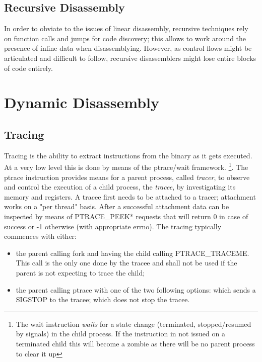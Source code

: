 \subsection{Recursive Disassembly}
In order to obviate to the issues of linear disassembly, recursive techniques rely on function calls and jumps for code discovery; this allows to work around the presence of inline data when disassemblying. However, as control flows might be articulated and difficult to follow, recursive disassemblers might lose entire blocks of code entirely.


\section{Dynamic Disassembly}

\subsection{Tracing}
Tracing is the ability to extract instructions from the binary as it gets executed. At a very low level this is done by means of the {\ttfamily ptrace/wait} framework.
\footnote{The {\ttfamily wait} instruction \textit{waits} for a state change (terminated, stopped/resumed by signals) in the child process. If the instruction in not issued on a terminated child this will become a zombie as there will be no parent process to clear it up}.
The {\ttfamily ptrace} instruction provides means for a parent process, called \textit{tracer}, to observe and control the execution of a child process, the \textit{tracee}, by investigating its memory and registers. A tracee first needs to be attached to a tracer; attachment works on a "per thread" basis.
After a successful attachment data can be inspected by means of {\ttfamily PTRACE\_PEEK*} requests that will return 0 in case of success or -1 otherwise (with appropriate {\ttfamily errno}).
The tracing typically commences with either: 
\begin{itemize}
    \item the parent calling {\ttfamily fork} and having the child calling {\ttfamily PTRACE\_TRACEME}. This call is the only one done by the tracee and shall not be used if the parent is not expecting to trace the child;
    \item the parent calling {\ttfamily ptrace} with one of the two following options:
         which sends a {\ttfamily SIGSTOP} to the tracee;
         which does not stop the tracee.
\end{itemize}
